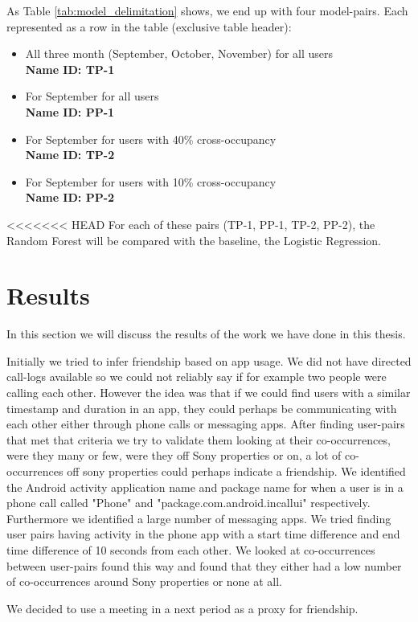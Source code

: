 As Table \ref{tab:model_delimitation} shows, we end up with four model-pairs. Each represented as a row in the table (exclusive table header): 
\begin{itemize}
\item All three month (September, October, November) for all users\\ \textbf{Name ID: TP-1}
\item For September for all users\\ \textbf{Name ID: PP-1}
\item For September for users with 40\% cross-occupancy\\ \textbf{Name ID: TP-2}
\item For September for users with 10\% cross-occupancy\\ \textbf{Name ID: PP-2}
\end{itemize}
<<<<<<< HEAD
For each of these pairs (TP-1, PP-1, TP-2, PP-2), the Random Forest will be compared with the baseline, the Logistic Regression. 
\section{Results}
In this section we will discuss the results of the work we have done in this thesis.

Initially we tried to infer friendship based on app usage. We did not have directed call-logs available so we could not reliably say if for example two people were calling each other. However the idea was that if we could find users with a similar timestamp and duration in an app, they could perhaps be communicating with each other either through phone calls or messaging apps. After finding user-pairs that met that criteria we try to validate them looking at their co-occurrences, were they many or few, were they off Sony properties or on, a lot of co-occurrences off sony properties could perhaps indicate a friendship. We identified the Android activity application name and package name for when a user is in a phone call called "Phone" and "package.com.android.incallui" respectively. Furthermore we identified a large number of messaging apps. We tried finding user pairs having activity in the phone app with a start time difference and end time difference of 10 seconds from each other. We looked at co-occurrences between user-pairs found this way and found that they either had a low number of co-occurrences around Sony properties or none at all.

We decided to use a meeting in a next period as a proxy for friendship.

